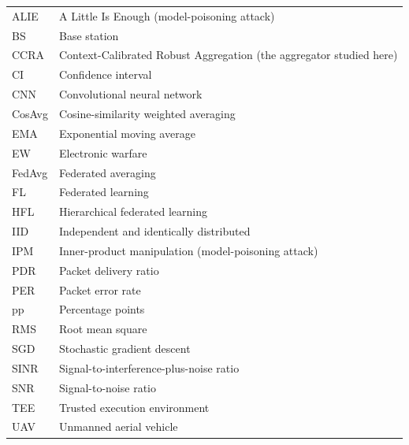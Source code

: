 \thispagestyle{plain}

\begin{longtable}{@{\hspace{12mm}}p{28mm}p{114mm}@{}}
ALIE & A Little Is Enough (model-poisoning attack) \\
BS & Base station \\
CCRA & Context-Calibrated Robust Aggregation (the aggregator studied here) \\
CI & Confidence interval \\
CNN & Convolutional neural network \\
CosAvg & Cosine-similarity weighted averaging \\
EMA & Exponential moving average \\
EW & Electronic warfare \\
FedAvg & Federated averaging \\
FL & Federated learning \\
HFL & Hierarchical federated learning \\
IID & Independent and identically distributed \\
IPM & Inner-product manipulation (model-poisoning attack) \\
PDR & Packet delivery ratio \\
PER & Packet error rate \\
pp & Percentage points \\
RMS & Root mean square \\
SGD & Stochastic gradient descent \\
SINR & Signal-to-interference-plus-noise ratio \\
SNR & Signal-to-noise ratio \\
TEE & Trusted execution environment \\
UAV & Unmanned aerial vehicle \\
\end{longtable}

\thispagestyle{plain}

